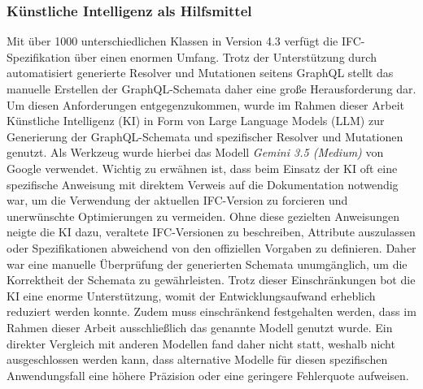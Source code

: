 \subsubsection{Künstliche Intelligenz als Hilfsmittel}
Mit über 1000 unterschiedlichen Klassen in Version 4.3 verfügt die IFC-Spezifikation über einen enormen Umfang. Trotz der Unterstützung durch automatisiert generierte Resolver und Mutationen seitens GraphQL stellt das
manuelle Erstellen der GraphQL-Schemata daher eine große Herausforderung dar. Um diesen Anforderungen entgegenzukommen, wurde im Rahmen dieser Arbeit Künstliche Intelligenz (KI) in Form von
Large Language Models (LLM) zur Generierung der GraphQL-Schemata und spezifischer Resolver und Mutationen genutzt. Als Werkzeug wurde hierbei das Modell \textit{Gemini 3.5 (Medium)} von Google verwendet.
Wichtig zu erwähnen ist, dass beim Einsatz der KI oft eine spezifische Anweisung mit direktem Verweis auf die Dokumentation notwendig war, um die Verwendung der aktuellen IFC-Version zu forcieren und
unerwünschte Optimierungen zu vermeiden. Ohne diese gezielten Anweisungen neigte die KI dazu, veraltete IFC-Versionen zu beschreiben, Attribute auszulassen oder Spezifikationen abweichend von den offiziellen
Vorgaben zu definieren. Daher war eine manuelle Überprüfung der generierten Schemata unumgänglich, um die Korrektheit der Schemata zu gewährleisten. \newline
Trotz dieser Einschränkungen bot die KI eine enorme Unterstützung, womit der Entwicklungsaufwand erheblich reduziert werden konnte.
Zudem muss einschränkend festgehalten werden, dass im Rahmen dieser Arbeit ausschließlich das genannte Modell genutzt wurde. Ein direkter Vergleich mit anderen Modellen fand daher nicht statt,
weshalb nicht ausgeschlossen werden kann, dass alternative Modelle für diesen spezifischen Anwendungsfall eine höhere Präzision oder eine geringere Fehlerquote aufweisen.
